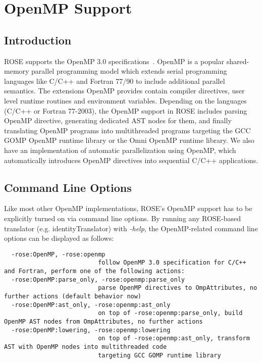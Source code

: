 \chapter{OpenMP Support}
\label{chap::ompsupport}

\section{Introduction}
ROSE supports the OpenMP 3.0 specifications~\cite{OpenMP3.0}. 
OpenMP is a popular shared-memory parallel programming model which extends serial programming languages like C/C++ and Fortran 77/90 to include additional parallel semantics. 
The extensions OpenMP provides contain compiler directives, user level runtime routines and environment variables. 
Depending on the languages (C/C++ or Fortran 77-2003), the OpenMP support in ROSE
includes parsing OpenMP directive, generating dedicated AST nodes for them,
and finally translating OpenMP programs into multithreaded programs
targeting the GCC GOMP OpenMP runtime library or the Omni OpenMP runtime
library. 
We also have an implementation of automatic parallelization using OpenMP,
which automatically introduces OpenMP directives into sequential C/C++ applications.

\section{Command Line Options}
Like most other OpenMP implementations, ROSE's OpenMP support has to be explicitly turned on via command line options.
By running any ROSE-based translator (e.g. identityTranslator) with \textit{-help}, 
the OpenMP-related command line options can be displayed as follows: 
{\scriptsize
\begin{verbatim}
  -rose:OpenMP, -rose:openmp
                          follow OpenMP 3.0 specification for C/C++ and Fortran, perform one of the following actions:
  -rose:OpenMP:parse_only, -rose:openmp:parse_only
                          parse OpenMP directives to OmpAttributes, no further actions (default behavior now)
  -rose:OpenMP:ast_only, -rose:openmp:ast_only
                          on top of -rose:openmp:parse_only, build OpenMP AST nodes from OmpAttributes, no further actions
  -rose:OpenMP:lowering, -rose:openmp:lowering
                          on top of -rose:openmp:ast_only, transform AST with OpenMP nodes into multithreaded code 
                          targeting GCC GOMP runtime library
\end{verbatim}
}

